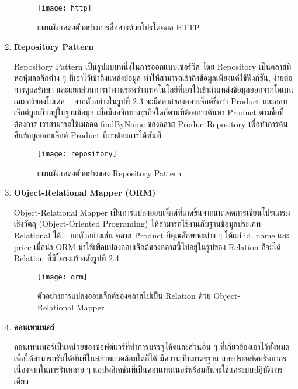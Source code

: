 \begin{enumerate}
	\begin{figure}[!h]
		\centering
		\texttt{[image: http]}  
		\caption{แผนผังแสดงตัวอย่างการสื่อสารด้วยโปรโตคอล HTTP}
		\label{Fig:http}
	\end{figure}

	\item \textbf{Repository Pattern}
	
	Repository Pattern เป็นรูปแบบหนึ่งในการออกแบบเซอร์วิส โดย Repository เป็นคลาสที่ห่อหุ้มลอจิกต่าง ๆ ที่เอาไว้เข้าถึงแหล่งข้อมูล ทำให้สามารถเข้าถึงข้อมูลเพียงแค่ใช้ฟังก์ชัน, ง่ายต่อการดูแลรักษา และแยกส่วนการทำงานระหว่างเทคโนโลยีที่เอาไว้เข้าถึงแหล่งข้อมูลออกจากโดเมนเลเยอร์ของโมเดล ~\cite{repositorypattern} จากตัวอย่างในรูปที่ 2.3 จะมีคลาสของออบเจ็กต์ชื่อว่า Product และออบเจ็กต์ถูกเก็บอยู่ในฐานข้อมูล เมื่อมีลอจิกทางธุรกิจใดก็ตามที่ต้องการค้นหา Product ตามชื่อที่ต้องการ เราสามารถใช้เมธอด findByName ของคลาส ProductRepository เพื่อทำการค้นคืนข้อมูลออบเจ็กต์ Product ที่เราต้องการได้ทันที
	
	\begin{figure}[!h]
		\centering
		\texttt{[image: repository]}  
		\caption{แผนผังแสดงตัวอย่างของ Repository Pattern}
		\label{Fig:repository}
	\end{figure}
	
	\item \textbf{Object-Relational Mapper (ORM)}
	
	Object-Relational Mapper เป็นการแปลงออบเจ็กต์ที่เกิดขึ้นจากแนวคิดการเขียนโปรแกรมเชิงวัตถุ (Object-Oriented Programing) ให้สามารถใช้งานกับฐานข้อมูลประเภท Relational ได้ ~\cite{orm} ยกตัวอย่างเช่น คลาส Product มีคุณลักษณะต่าง ๆ ได้แก่ id, name และ price เมื่อนำ ORM มาใช้เพื่อแปลงออบเจ็กต์ของคลาสนี้ไปอยู่ในรูปของ Relation ก็จะได้ Relation ที่มีโครงสร้างดังรูปที่ 2.4
	
	\begin{figure}[!h]
		\centering
		\texttt{[image: orm]}  
		\caption{ตัวอย่างการแปลงออบเจ็กต์ของคลาสไปเป็น Relation ด้วย Object-Relational Mapper}
		\label{Fig:orm}
	\end{figure}
	
	\item \textbf{คอนเทนเนอร์}
	
	คอนเทนเนอร์เป็นหน่วยของซอฟต์แวร์ที่ทำการบรรจุโค้ดและส่วนอื่น ๆ ที่เกี่ยวข้องเอาไว้ทั้งหมดเพื่อให้สามารถรันได้ทันทีในสภาพแวดล้อมใดก็ได้ มีความเป็นมาตรฐาน และประหยัดทรัพยากร เนื่องจากในการรันหลาย ๆ แอปพลิเคชันที่เป็นคอนเทนเนอร์พร้อมกันจะใช้แค่ระบบปฏิบัติการเดียว
	

\end{enumerate}
